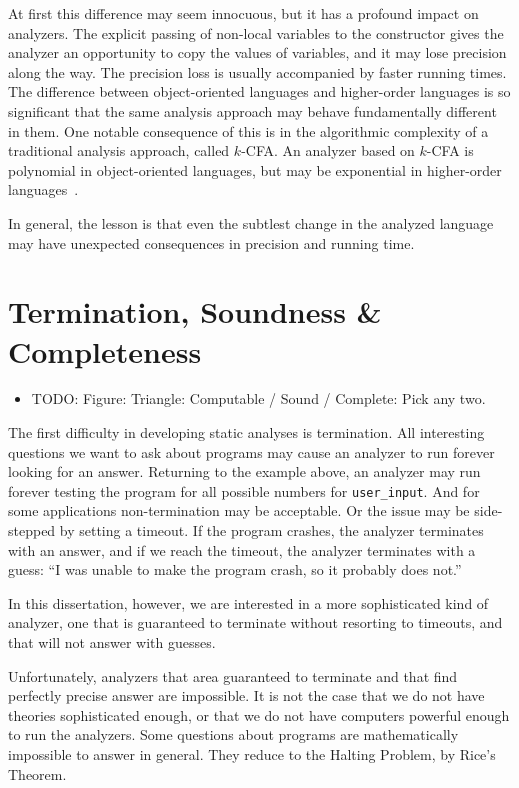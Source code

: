 \documentclass[12pt, oneside]{book}
\begin{document}
At first this difference may seem innocuous, but it has a profound impact on analyzers. The explicit passing of non-local variables to the constructor gives the analyzer an opportunity to copy the values of variables, and it may lose precision along the way. The precision loss is usually accompanied by faster running times. The difference between object-oriented languages and higher-order languages is so significant that the same analysis approach may behave fundamentally different in them. One notable consequence of this is in the algorithmic complexity of a traditional analysis approach, called \(k\)-CFA. An analyzer based on \(k\)-CFA is polynomial in object-oriented languages, but may be exponential in higher-order languages~\cite{m-cfa}.

In general, the lesson is that even the subtlest change in the analyzed language may have unexpected consequences in precision and running time.

\section{Termination, Soundness \& Completeness}
\label{section:termination-soundness-and-completeness}

\begin{itemize}
  \item TODO: Figure: Triangle: Computable / Sound / Complete: Pick any two.
\end{itemize}

The first difficulty in developing static analyses is termination. All interesting questions we want to ask about programs may cause an analyzer to run forever looking for an answer. Returning to the example above, an analyzer may run forever testing the program for all possible numbers for \texttt{user\_input}. And for some applications non-termination may be acceptable. Or the issue may be side-stepped by setting a timeout. If the program crashes, the analyzer terminates with an answer, and if we reach the timeout, the analyzer terminates with a guess: “I was unable to make the program crash, so it probably does not.”

In this dissertation, however, we are interested in a more sophisticated kind of analyzer, one that is guaranteed to terminate without resorting to timeouts, and that will not answer with guesses.

Unfortunately, analyzers that area guaranteed to terminate and that find perfectly precise answer are impossible. It is not the case that we do not have theories sophisticated enough, or that we do not have computers powerful enough to run the analyzers. Some questions about programs are mathematically impossible to answer in general. They reduce to the Halting Problem, by Rice’s Theorem.
\end{document}
